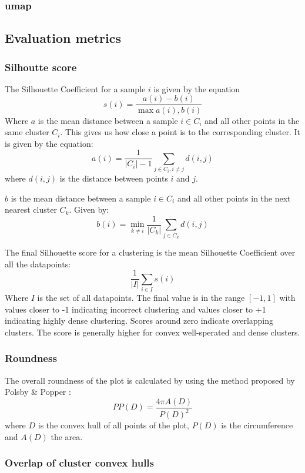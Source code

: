 \documentclass[11pt]{article}
\begin{document}
\subsubsection{umap}
\label{sec:org6a758a8}
\subsection{Evaluation metrics}
\label{sec:org078e27c}
\subsubsection{Silhoutte score}
\label{sec:org8d91088}

The Silhouette Coefficient for a sample \(i\) is given by the equation
\[s(i) = \frac{a(i) - b(i)}{\max{a(i), b(i)}} \]
Where \(a\) is the mean distance between a sample \(i \in C_{i}\) and all other points in the same cluster \(C_{i}\). This gives us how close a point is to the corresponding cluster. It is given by the equation:
\[ a(i) = \frac{1}{|C_{i}| - 1} \sum_{j \in C_{i}, i \neq j}{d(i,j)}\]
where \(d(i,j)\) is the distance between points \(i\) and \(j\).

\(b\) is the mean distance between a sample \(i \in C_{i}\) and all other points in the next nearest cluster \(C_{k}\). Given by:
\[ b(i) = \min_{k \neq i}{\frac{1}{|C_{k}|} \sum_{j \in C_{k}}{d(i,j)}} \]

The final Silhouette score for a clustering is the mean Silhouette Coefficient over all the datapoints:
\[ \frac{1}{|I|}\sum_{i \in I}{s(i)} \]
Where \(I\) is the set of all datapoints. The final value is in the range \([-1, 1]\) with values closer to -1 indicating incorrect clustering and values closer to +1 indicating highly dense clustering. Scores around zero indicate overlapping clusters. The score is generally higher for convex well-sperated and dense clusters.

\subsubsection{Roundness}
\label{sec:org7b61201}

The overall roundness of the plot is calculated by using the method proposed by Polsby \& Popper \cite{popper}:
\[PP(D) = \frac{4 \pi A(D)}{P(D)^{2}} \]
where \(D\) is the convex hull of all points of the plot, \(P(D)\) is the circumference and \(A(D)\) the area.
\subsubsection{Overlap of cluster convex hulls}
\label{sec:org274a5d2}
\end{document}
